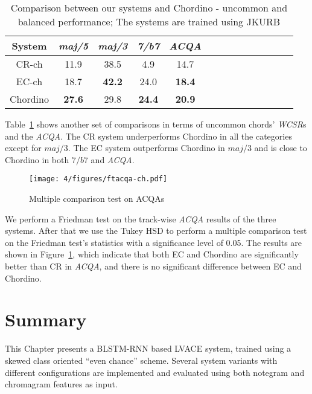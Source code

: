 \begin{table}[htb]
	\caption{Comparison between our systems and Chordino - uncommon and balanced performance; The systems are trained using JKURB}
	\label{tab:4-cpcd-2}
	\centering
	\scriptsize
	\begin{tabular}{|c|c|c|c|c|c|c|c|c|c|c|c|c|c|}\hline
		System & \textit{maj/5} & \textit{maj/3} & \textit{7/b7} & \textit{ACQA} \\ \hline
		CR-ch & 11.9 & 38.5 & 4.9 & 14.7\\ \hline
		EC-ch & 18.7 & \textbf{42.2} & 24.0 & \textbf{18.4}\\ \hline
		Chordino & \textbf{ 27.6} & 29.8 & \textbf{24.4} & \textbf{20.9}\\ \hline
	\end{tabular}
\end{table}
Table~\ref{tab:4-cpcd-2} shows another set of comparisons in terms of uncommon chords' \textit{WCSR}s and the \textit{ACQA}. The CR system underperforms Chordino in all the categories except for $maj/3$.	The EC system outperforms Chordino in $maj/3$ and is close to Chordino in both $7/b7$ and \textit{ACQA}.

\begin{figure}[h!]
	\centering
	\texttt{[image: 4/figures/ftacqa-ch.pdf]}
	\caption{Multiple comparison test on ACQAs}
	\label{fig:4-ftacqa-ch}
\end{figure}
We perform a Friedman test on the track-wise \textit{ACQA} results of the three systems. After that we use the Tukey HSD to perform a multiple comparison test on the Friedman test's statistics with a significance level of 0.05. The results are shown in Figure~\ref{fig:4-ftacqa-ch}, which indicate that both EC and Chordino are significantly better than CR in \textit{ACQA}, and there is no significant difference between EC and Chordino.

\section{Summary}\label{sec:4-concln}
This Chapter presents a BLSTM-RNN based LVACE system, trained using a skewed class oriented ``even chance'' scheme. Several system variants with different configurations are implemented and evaluated using both notegram and chromagram features as input.

